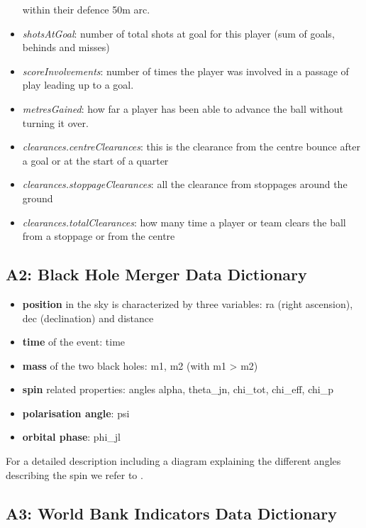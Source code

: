 \begin{itemize}
  within their defence 50m arc.\\
\item
  \emph{shotsAtGoal}: number of total shots at goal for this player (sum
  of goals, behinds and misses)
\item
  \emph{scoreInvolvements}: number of times the player was involved in a
  passage of play leading up to a goal.
\item
  \emph{metresGained}: how far a player has been able to advance the
  ball without turning it over.\\
\item
  \emph{clearances.centreClearances}: this is the clearance from the
  centre bounce after a goal or at the start of a quarter
\item
  \emph{clearances.stoppageClearances}: all the clearance from stoppages
  around the ground
\item
  \emph{clearances.totalClearances}: how many time a player or team
  clears the ball from a stoppage or from the centre
\end{itemize}

\hypertarget{a2-black-hole-merger-data-dictionary}{%
\subsection{A2: Black Hole Merger Data
Dictionary}\label{a2-black-hole-merger-data-dictionary}}

\begin{itemize}
\tightlist
\item
  \textbf{position} in the sky is characterized by three variables: ra
  (right ascension), dec (declination) and distance
\item
  \textbf{time} of the event: time
\item
  \textbf{mass} of the two black holes: m1, m2 (with m1 \textgreater{}
  m2)
\item
  \textbf{spin} related properties: angles alpha, theta\_jn, chi\_tot,
  chi\_eff, chi\_p
\item
  \textbf{polarisation angle}: psi
\item
  \textbf{orbital phase}: phi\_jl
\end{itemize}

For a detailed description including a diagram explaining the different
angles describing the spin we refer to \citet{Smith:2016qas}.

\hypertarget{a3-world-bank-indicators-data-dictionary}{%
\subsection{A3: World Bank Indicators Data
Dictionary}\label{a3-world-bank-indicators-data-dictionary}}

